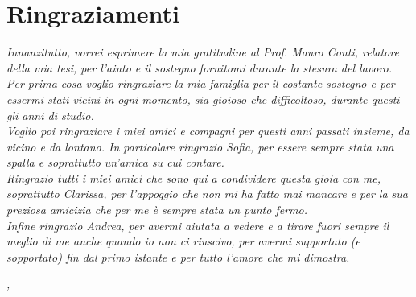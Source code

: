 
\cleardoublepage
{}
{}

	\slshape    


\bigskip

\begingroup
\let\clearpage\relax
\let\cleardoublepage\relax
\let\cleardoublepage\relax

\chapter*{Ringraziamenti}

\noindent \textit{Innanzitutto, vorrei esprimere la mia gratitudine al Prof. Mauro Conti, relatore della mia tesi, per l'aiuto e il sostegno fornitomi durante la stesura del lavoro.}\\

\noindent \textit{Per prima cosa voglio ringraziare la mia famiglia per il costante sostegno e per essermi stati vicini in ogni momento, sia gioioso che difficoltoso, durante questi gli anni di studio.}\\

\noindent \textit{Voglio poi ringraziare i miei amici e compagni per questi anni passati insieme, da vicino e da lontano. In particolare ringrazio Sofia, per essere sempre stata una spalla e soprattutto un'amica su cui contare.}\\

\noindent \textit{Ringrazio tutti i miei amici che sono qui a condividere questa gioia con me, soprattutto Clarissa, per l'appoggio che non mi ha fatto mai mancare e per la sua preziosa amicizia che per me è sempre stata un punto fermo.}\\

\noindent \textit{Infine ringrazio Andrea, per avermi aiutata a vedere e a tirare fuori sempre il meglio di me anche quando io non ci riuscivo, per avermi supportato (e sopportato) fin dal primo istante e per tutto l'amore che mi dimostra.}\\
\bigskip

\noindent\textit{\myLocation, \myTime}
\hfill \myName

\endgroup

